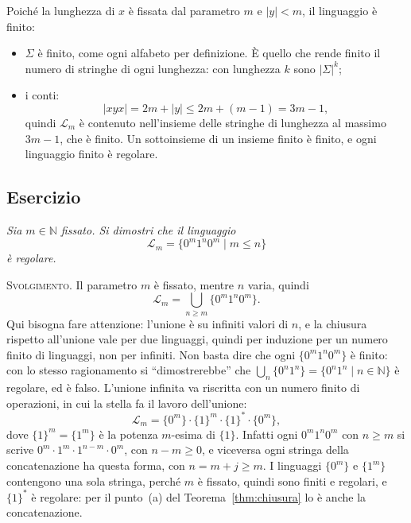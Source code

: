 \documentclass[a4paper, 11pt, oneside]{book}
\makeatletter
\theoremstyle{formale}
\newcommand{\spaziominimo}[1]{%
    \par
    \if@nobreak\else
        \ifdim\pagegoal<\maxdimen
            \ifdim\dimexpr\pagegoal-\pagetotal\relax<#1\relax
                \ifdim\pagetotal>\pagegoal\else
                    \newpage
                \fi
            \fi
        \fi
    \fi}
\newcounter{escount}[section]
\newcommand{\esercizio}{
    \spaziominimo{8\baselineskip}%
    \refstepcounter{escount}%
    \subsection*{Esercizio \arabic{escount}}%
}
\makeatother
\begin{document}
    Poich\'e la lunghezza di $x$ \`e fissata dal parametro $m$ e $|y| < m$, il linguaggio
    \`e finito:
    \begin{itemize}
        \item $\Sigma$ \`e finito, come ogni alfabeto per definizione. \`E quello che rende
            finito il numero di stringhe di ogni lunghezza: con lunghezza $k$ sono
            $|\Sigma|^k$;
        \item i conti:
            \begin{equation*}
                |xyx| = 2m + |y| \leq 2m + (m - 1) = 3m - 1,
            \end{equation*}
            quindi $\mathcal{L}_m$ \`e contenuto nell'insieme delle stringhe di lunghezza
            al massimo $3m - 1$, che \`e finito. Un sottoinsieme di un insieme finito \`e
            finito, e ogni linguaggio finito \`e regolare.
    \end{itemize}

    \esercizio
    \textit{Sia $m \in \mathbb{N}$ fissato. Si dimostri che il linguaggio
    \begin{equation*}
        \mathcal{L}_m = \{0^m 1^n 0^m \mid m \leq n\}
    \end{equation*}
    \`e regolare.}

    \textsc{Svolgimento}. Il parametro $m$ \`e fissato, mentre $n$ varia, quindi
    \begin{equation*}
        \mathcal{L}_m = \bigcup_{n \geq m} \{0^m 1^n 0^m\}.
    \end{equation*}
    Qui bisogna fare attenzione: l'unione \`e su infiniti valori di $n$, e la chiusura
    rispetto all'unione vale per due linguaggi, quindi per induzione per un numero finito
    di linguaggi, non per infiniti. Non basta dire che ogni $\{0^m 1^n 0^m\}$ \`e finito:
    con lo stesso ragionamento si ``dimostrerebbe'' che
    $\bigcup_{n} \{0^n 1^n\} = \{0^n 1^n \mid n \in \mathbb{N}\}$ \`e regolare, ed \`e
    falso. L'unione infinita va riscritta con un numero finito di operazioni, in cui la
    stella fa il lavoro dell'unione:
    \begin{equation*}
        \mathcal{L}_m = \{0^m\} \cdot \{1\}^m \cdot \{1\}^* \cdot \{0^m\},
    \end{equation*}
    dove $\{1\}^m = \{1^m\}$ \`e la potenza $m$-esima di $\{1\}$. Infatti ogni
    $0^m 1^n 0^m$ con $n \geq m$ si scrive $0^m \cdot 1^m \cdot 1^{n - m} \cdot 0^m$, con
    $n - m \geq 0$, e viceversa ogni stringa della concatenazione ha questa forma, con
    $n = m + j \geq m$. I linguaggi $\{0^m\}$ e $\{1^m\}$ contengono una sola stringa,
    perch\'e $m$ \`e fissato, quindi sono finiti e regolari, e $\{1\}^*$ \`e regolare: per
    il punto~(a) del Teorema~\ref{thm:chiusura} lo \`e anche la concatenazione.
\end{document}
